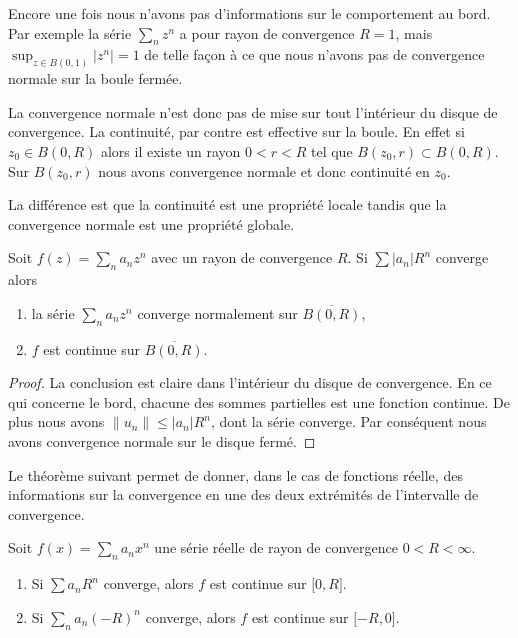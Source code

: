\begin{example}
    Encore une fois nous n'avons pas d'informations sur le comportement au bord. Par exemple la série \( \sum_nz^n\) a pour rayon de convergence \( R=1\), mais \( \sup_{z\in B(0,1)}| z^n |=1\) de telle façon à ce que nous n'avons pas de convergence normale sur la boule fermée.
\end{example}

La convergence normale n'est donc pas de mise sur tout l'intérieur du disque de convergence. La continuité, par contre est effective sur la boule. En effet si \( z_0\in B(0,R)\) alors il existe un rayon \( 0<r<R\) tel que \( B(z_0,r)\subset B(0,R)\). Sur \( B(z_0,r)\) nous avons convergence normale et donc continuité en \( z_0\).

La différence est que la continuité est une propriété locale tandis que la convergence normale est une propriété globale.

\begin{proposition}
    Soit \( f(z)=\sum_na_nz^n\) avec un rayon de convergence \( R\). Si \( \sum | a_n |R^n\) converge alors
    \begin{enumerate}
        \item
            la série \( \sum_na_nz^n\) converge normalement sur \( \overline{ B(0,R) }\),
        \item
            \( f\) est continue sur \( \overline{ B(0,R) }\).
    \end{enumerate}
\end{proposition}

\begin{proof}
    La conclusion est claire dans l'intérieur du disque de convergence. En ce qui concerne le bord, chacune des sommes partielles est une fonction continue. De plus nous avons \( \| u_n \|\leq | a_n |R^n\), dont la série converge. Par conséquent nous avons convergence normale sur le disque fermé.
\end{proof}

Le théorème suivant permet de donner, dans le cas de fonctions réelle, des informations sur la convergence en une des deux extrémités de l'intervalle de convergence.
\begin{theorem} \label{ThoLUXVjs}
    Soit \( f(x)=\sum_na_nx^n\) une série réelle de rayon de convergence \( 0<R<\infty\).
    \begin{enumerate}
        \item
            Si \( \sum a_nR^n\) converge, alors \( f\) est continue sur \( \mathopen[ 0 , R \mathclose]\).
        \item
            Si \( \sum_na_n(-R)^n\) converge, alors \( f\) est continue sur \( \mathopen[ -R , 0 \mathclose]\).
    \end{enumerate}
\end{theorem}

